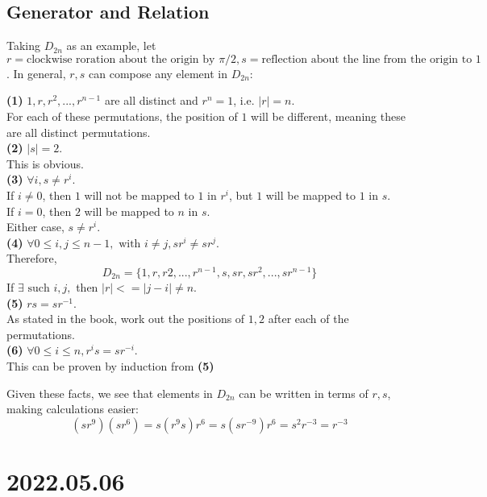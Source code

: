 \documentclass{article}
\begin{document}
\subsection{Generator and Relation}
Taking $D_{2n}$ as an example, let $r = \textrm{clockwise roration about the origin by } \pi / 2, s = \textrm{reflection about the line from the origin to } 1$. In general, $r,s$ can compose any element in $D_{2n}$:
\begin{addmargin}[1em]{0em}
    \textbf{(1)} $1,r,r^2,...,r^{n-1}$ are all distinct and $r^n=1$, i.e. $|r|=n$.\\
    For each of these permutations, the position of $1$ will be different, meaning these are all distinct permutations.\\
    \textbf{(2)} $|s|=2$.\\
    This is obvious.\\
    \textbf{(3)} $\forall i, s \neq r^i$.\\
    If $i \neq 0$, then $1$ will not be mapped to $1$ in $r^i$, but $1$ will be mapped to $1$ in $s$.\\
    If $i = 0$, then $2$ will be mapped to $n$ in $s$.\\
    Either case, $s \neq r^i$.\\
    \textbf{(4)} $\forall 0 \leq i,j \leq n-1, \textrm{ with }i\neq j, sr^i \neq sr^j$.\\
    Therefore,
    \begin{equation*}
        D_{2n} = \{1,r,r2,...,r^{n-1},s,sr,sr^2,...,sr^{n-1}\}
    \end{equation*}
    If $\exists \textrm{ such } i,j,$ then $|r| <= |j-i| \neq n$.\\
    \textbf{(5)} $rs=sr^{-1}$.\\
    As stated in the book, work out the positions of $1, 2$ after each of the permutations.\\
    \textbf{(6)} $\forall 0 \leq i \leq n, r^i s=sr^{-i}$.\\
    This can be proven by induction from \textbf{(5)}
\end{addmargin}
Given these facts, we see that elements in $D_{2n}$ can be written in terms of $r, s$, making calculations easier:
\begin{equation*}
    (sr^9)(sr^6)=s(r^9s)r^6=s(sr^{-9})r^6=s^2r^{-3}=r^{-3}
\end{equation*}
\section{2022.05.06}
\end{document}

